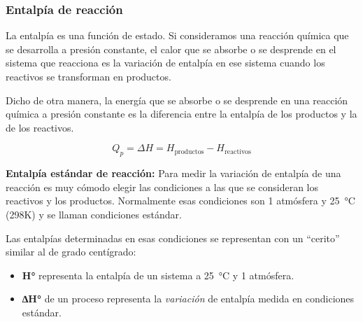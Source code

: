 \documentclass[
  spanish,
]{article}
\begin{document}
\hypertarget{entalpuxeda-de-reacciuxf3n}{%
\subsubsection{Entalpía de reacción}\label{entalpuxeda-de-reacciuxf3n}}

\hfill{}

La entalpía es una función de estado. Si consideramos una reacción
química que se desarrolla a presión constante, el calor que se absorbe o
se desprende en el sistema que reacciona es la variación de entalpía en
ese sistema cuando los reactivos se transforman en productos.

Dicho de otra manera, la energía que se absorbe o se desprende en una
reacción química a presión constante es la diferencia entre la entalpía
de los productos y la de los reactivos.

\[Q_{p} = \Delta H = H_\text{productos} - H_\text{reactivos}\]

\textbf{Entalpía estándar de reacción:} Para medir la variación de
entalpía de una reacción es muy cómodo elegir las condiciones a las que
se consideran los reactivos y los productos. Normalmente esas
condiciones son 1 atmósfera y \qty{25}{\degreeCelsius} (298K) y se
llaman condiciones estándar.

Las entalpías determinadas en esas condiciones se representan con un
``cerito'' similar al de grado centígrado:

\begin{itemize}
\item
  \textbf{H°} representa la entalpía de un sistema a
  \qty{25}{\degreeCelsius} y 1 atmósfera.
\item
  \textbf{∆H°} de un proceso representa la \emph{variación} de entalpía
  medida en condiciones estándar.
\end{itemize}
\end{document}
